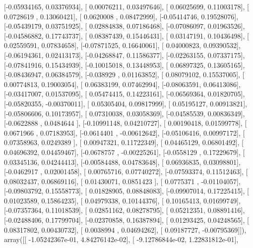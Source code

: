 \documentclass{article}
\begin{document}
       [-0.05934165,  0.03376934],
       [ 0.00076211,  0.03497646],
       [ 0.06025699,  0.11003178],
       [ 0.0728619 ,  0.13060421],
       [ 0.0620008 ,  0.08472999],
       [-0.05414746,  0.19528076],
       [-0.05439179,  0.03751925],
       [ 0.02884838,  0.07186468],
       [-0.07086097,  0.01963526],
       [-0.04586882,  0.17743737],
       [ 0.08387439,  0.15446431],
       [ 0.03147191,  0.10436498],
       [ 0.02559591,  0.07834658],
       [-0.07871525,  0.16640061],
       [ 0.04000823,  0.09390532],
       [-0.06194361,  0.02413173],
       [-0.04268847,  0.11586377],
       [-0.02263155,  0.07337175],
       [-0.07841916,  0.15434939],
       [-0.10015018,  0.13448953],
       [ 0.06897325,  0.13605165],
       [-0.08436947,  0.06384579],
       [-0.038929  ,  0.01163852],
       [ 0.08079102,  0.15537005],
       [ 0.00774813,  0.19003054],
       [ 0.06383199,  0.07462994],
       [-0.08063591,  0.06413086],
       [-0.03417007,  0.01537095],
       [ 0.05474415,  0.14223161],
       [-0.06569364,  0.01820705],
       [-0.05820355, -0.00370011],
       [ 0.05305404,  0.09817999],
       [ 0.05195127,  0.00913821],
       [-0.05806606,  0.10173957],
       [ 0.07310038,  0.03058369],
       [-0.04585539,  0.00836349],
       [-0.0622888 ,  0.0484644 ],
       [-0.10991148,  0.04210727],
       [ 0.00190418,  0.01599778],
       [ 0.0671966 ,  0.07183953],
       [-0.0614401 , -0.00612642],
       [-0.05106416,  0.00997172],
       [ 0.07358963,  0.0249389 ],
       [ 0.00947321,  0.11722349],
       [ 0.04465129,  0.06801492],
       [ 0.04696392,  0.04459467],
       [-0.0678757 , -0.00225261],
       [-0.0558129 ,  0.17229679],
       [ 0.03345136,  0.04244413],
       [-0.00584488,  0.04783648],
       [ 0.06936835,  0.03098801],
       [-0.0462917 ,  0.02001458],
       [ 0.00765716,  0.07740272],
       [-0.07593374,  0.11512463],
       [ 0.08032437,  0.06869116],
       [ 0.01430071,  0.0851423 ],
       [ 0.0775371 , -0.01104057],
       [-0.09803792,  0.15558773],
       [ 0.01828905,  0.08848083],
       [-0.09907014,  0.17225415],
       [ 0.01023589,  0.15864235],
       [ 0.04979338,  0.10144376],
       [ 0.10165413,  0.01699749],
       [-0.07357364,  0.11018539],
       [ 0.02851162,  0.08278795],
       [ 0.05212351,  0.08891416],
       [-0.02488406,  0.17799704],
       [-0.02370858,  0.16387894],
       [ 0.01293425,  0.04248565],
       [ 0.08317802,  0.00430732],
       [ 0.0038994 ,  0.04694262],
       [ 0.09187727, -0.00795369]]), array([[ -1.05242367e-01,   4.84276142e-02],
       [ -9.12786844e-02,   1.22831812e-01],
\end{document}
